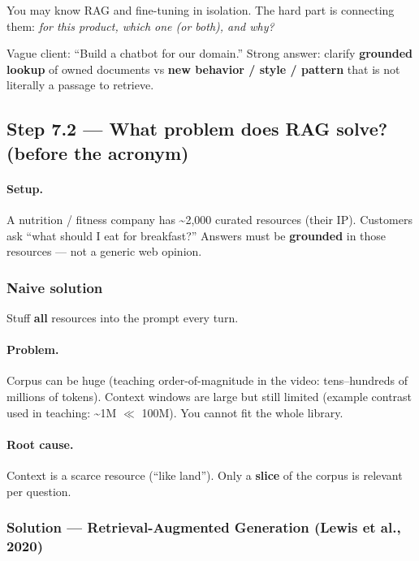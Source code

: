 \documentclass[11pt,a4paper]{article}
\begin{document}
You may know RAG and fine-tuning in isolation. The hard part is connecting them: \textit{for this product, which one (or both), and why?}


Vague client: ``Build a chatbot for our domain.''   Strong answer: clarify \textbf{grounded lookup} of owned documents vs \textbf{new behavior / style / pattern} that is not literally a passage to retrieve.


\subsection{Step 7.2 --- What problem does RAG solve? (before the acronym)}


\paragraph{Setup.}

A nutrition / fitness company has \textasciitilde{}2,000 curated resources (their IP). Customers ask ``what should I eat for breakfast?'' Answers must be \textbf{grounded} in those resources --- not a generic web opinion.


\subsubsection{Naive solution}

Stuff \textbf{all} resources into the prompt every turn.


\paragraph{Problem.}

Corpus can be huge (teaching order-of-magnitude in the video: tens--hundreds of millions of tokens). Context windows are large but still limited (example contrast used in teaching: \textasciitilde{}1M $\ll$ 100M). You cannot fit the whole library.


\paragraph{Root cause.}

Context is a scarce resource (``like land''). Only a \textbf{slice} of the corpus is relevant per question.


\subsubsection{Solution --- Retrieval-Augmented Generation (Lewis et al., 2020)}
\end{document}
